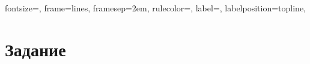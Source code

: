 
\isonefalse
\def \labnum {2}
\def \labsubj {Тестирование программного обеспечения}
\def \labauthor {Айтуганов Д. А. \\ Чебыкин И. Б.}
\def \labgroup {P3301}
\isinspfalse
\def \labinsp {}
\def \labname {Вариант: 633}
\isnametrue

\usepackage{graphicx}
\usepackage{verbatim}
\usepackage[dvipsnames]{xcolor}

\usepackage{fancyvrb}

 {
 fontsize=\scriptsize,
 frame=lines,  %
 framesep=2em, %
 rulecolor=\color{Gray},
 label=,
 labelposition=topline,
}



\section{Задание}

